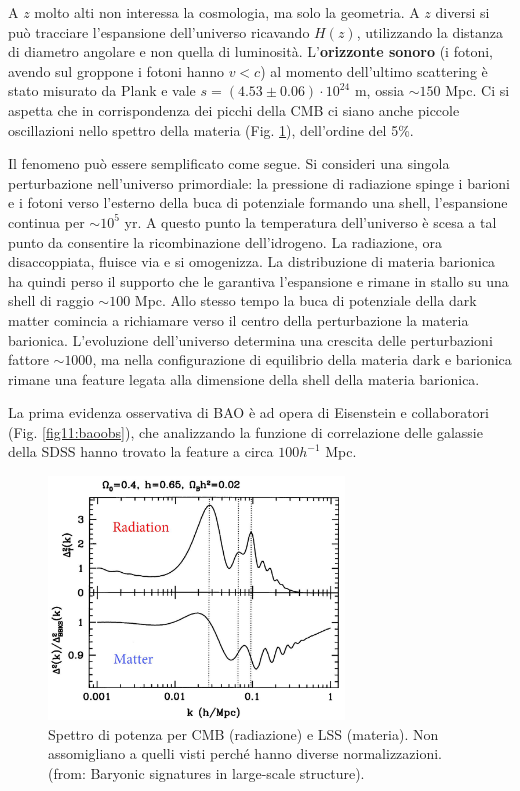 A $z$ molto alti non interessa la cosmologia, ma solo la geometria. A $z$ diversi si può tracciare l'espansione dell'universo ricavando $H(z)$, utilizzando la distanza di diametro angolare e non quella di luminosità. L'\textbf{orizzonte sonoro} (i fotoni, avendo sul groppone i fotoni hanno $v<c$) al momento dell'ultimo scattering è stato misurato da Plank e vale $s=(4.53\pm 0.06)\cdot 10^{24}$ m, ossia $\sim 150$ Mpc.
Ci si aspetta che in corrispondenza dei picchi della CMB ci siano anche piccole oscillazioni nello spettro della materia (Fig. \ref{fig11:bao}), dell'ordine del 5\%. 

Il fenomeno può essere semplificato come segue. Si consideri una singola perturbazione nell'universo primordiale: la pressione di radiazione spinge i barioni e i fotoni verso l'esterno della buca di potenziale formando una shell, l'espansione continua per $\sim 10^5$ yr. A questo punto la temperatura dell'universo è scesa a tal punto da consentire la ricombinazione dell'idrogeno. La radiazione, ora disaccoppiata, fluisce via e si omogenizza. La distribuzione di materia barionica ha quindi perso il supporto che le garantiva l'espansione e rimane in stallo su una shell di raggio $\sim 100$ Mpc. Allo stesso tempo la buca di potenziale della dark matter comincia a richiamare verso il centro della perturbazione la materia barionica. L'evoluzione dell'universo determina una crescita delle perturbazioni fattore $\sim 1000$, ma nella configurazione di equilibrio della materia dark e barionica rimane una feature legata alla dimensione della shell della materia barionica. 

La prima evidenza osservativa di BAO è ad opera di Eisenstein e collaboratori (Fig. \ref{fig11:baoobs}), che analizzando la funzione di correlazione delle galassie della SDSS hanno trovato la feature a circa $100 h^{-1}$ Mpc.

\begin{figure}[H]
    \centering
    \includegraphics[width=0.7\textwidth]{Pictures/11/BAO.jpg}
    \caption{Spettro di potenza per CMB (radiazione) e LSS (materia). Non assomigliano a quelli visti perché hanno diverse normalizzazioni. (from: Baryonic signatures in large-scale structure).}\label{fig11:bao}
\end{figure}

